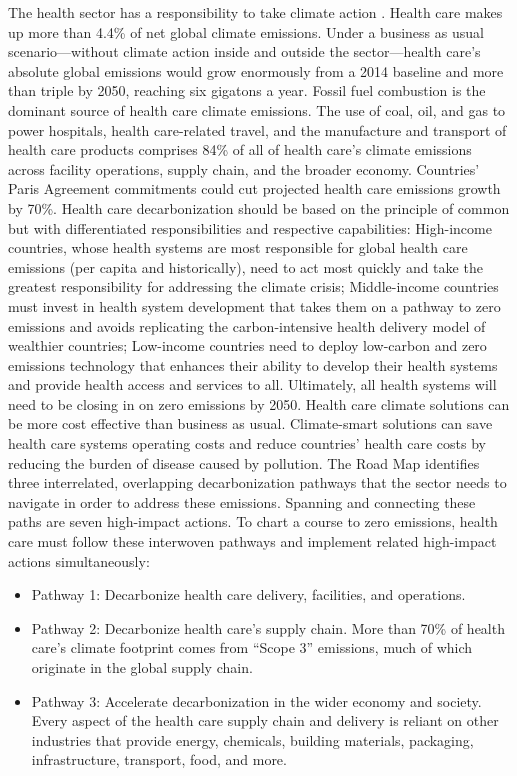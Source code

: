 The health sector has a responsibility to take climate action \cite{health_care_without_harm_hcwh_global_2021}. Health care makes up more than 4.4\% of net global climate emissions. Under a business as usual scenario—without climate action inside and outside the sector—health care's absolute global emissions would grow enormously from a 2014 baseline and more than triple by 2050, reaching six gigatons a year. Fossil fuel combustion is the dominant source of health care climate emissions. The use of coal, oil, and gas to power hospitals, health care-related travel, and the manufacture and transport of health care products comprises 84\% of all of health care's climate emissions across facility operations, supply chain, and the broader economy. Countries' Paris Agreement commitments could cut projected health care emissions growth by 70\%.
Health care decarbonization should be based on the principle of common but with differentiated responsibilities and respective capabilities: High-income countries, whose health systems are most responsible for global health care emissions (per capita and historically), need to act most quickly and take the greatest responsibility for addressing the climate crisis; Middle-income countries must invest in health system development that takes them on a pathway to zero emissions and avoids replicating the carbon-intensive health delivery model of wealthier countries; Low-income countries need to deploy low-carbon and zero emissions technology that enhances their ability to develop their health systems and provide health access and services to all. Ultimately, all health systems will need to be closing in on zero emissions by 2050. Health care climate solutions can be more cost effective than business as usual. Climate-smart solutions can save health care systems operating costs and reduce countries' health care costs by reducing the burden of disease caused by pollution.
The Road Map identifies three interrelated, overlapping decarbonization pathways that the sector needs to navigate in order to address these emissions. Spanning and connecting these paths are seven high-impact actions. To chart a course to zero emissions, health care must follow these interwoven pathways and implement related high-impact actions simultaneously:

\begin{itemize}
    \item Pathway 1: Decarbonize health care delivery, facilities, and operations.
    \item Pathway 2: Decarbonize health care's supply chain. More than 70\% of health care's climate footprint comes from ``Scope 3'' emissions, much of which originate in the global supply chain.
    \item Pathway 3: Accelerate decarbonization in the wider economy and society. Every aspect of the health care supply chain and delivery is reliant on other industries that provide energy, chemicals, building materials, packaging, infrastructure, transport, food, and more.
\end{itemize}

